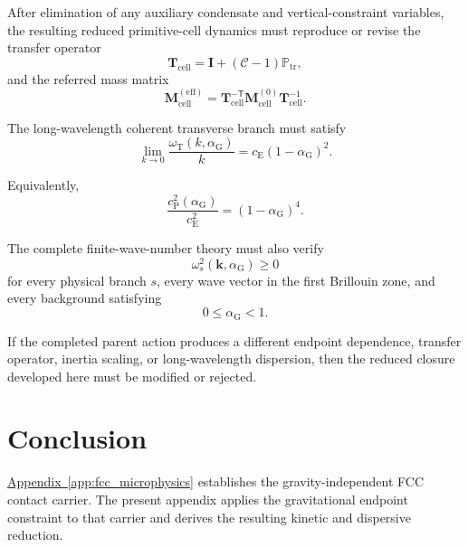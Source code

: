 After elimination of any auxiliary condensate and vertical-constraint variables, the resulting reduced primitive-cell dynamics must reproduce or revise the transfer operator
\begin{equation}
    \mathbf{T}_{\mathrm{cell}} = \mathbf{I} + \left( \mathcal{C}-1 \right) \mathbb{P}_{\mathrm{tr}},
\end{equation}
and the referred mass matrix
\begin{equation}
    \mathbf{M}_{\mathrm{cell}}^{(\mathrm{eff})} = \mathbf{T}_{\mathrm{cell}}^{-\mathsf{T}} \mathbf{M}_{\mathrm{cell}}^{(0)} \mathbf{T}_{\mathrm{cell}}^{-1}.
\end{equation}

The long-wavelength coherent transverse branch must satisfy
\begin{equation}
    \lim_{k\rightarrow0} \frac{ \omega_{\mathrm{T}} \left( k, \alpha_{\mathrm{G}} \right) }{k} = c_{\mathrm{E}} \left( 1-\alpha_{\mathrm{G}} \right)^2.
    \label{eq:microscopic_completion_speed}
\end{equation}

Equivalently,
\begin{equation}
    \frac{ c_{\mathrm{P}}^2 \left( \alpha_{\mathrm{G}} \right) }{ c_{\mathrm{E}}^2 } = \left( 1-\alpha_{\mathrm{G}} \right)^4.
    \label{eq:microscopic_completion_ratio}
\end{equation}

The complete finite-wave-number theory must also verify
\begin{equation}
    \omega_{s}^2 \left( \mathbf{k}, \alpha_{\mathrm{G}} \right) \geq 0
\end{equation}
for every physical branch $s$, every wave vector in the first Brillouin zone, and every background satisfying
\begin{equation}
    0 \leq \alpha_{\mathrm{G}} < 1.
\end{equation}

If the completed parent action produces a different endpoint dependence, transfer operator, inertia scaling, or long-wavelength dispersion, then the reduced closure developed here must be modified or rejected.

\section{Conclusion}

\hyperref[app:fcc_microphysics]{Appendix~\ref*{app:fcc_microphysics}} establishes the gravity-independent FCC contact carrier. The present appendix applies the gravitational endpoint constraint to that carrier and derives the resulting kinetic and dispersive reduction.

